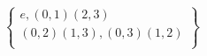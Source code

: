 \documentclass[preview]{standalone}
\begin{document}
\begin{align*}
\begin{Bmatrix}e,(0,1)(2,3)\\(0,2)(1,3),(0,3)(1,2)\\\end{Bmatrix}
\end{align*}
\end{document}
